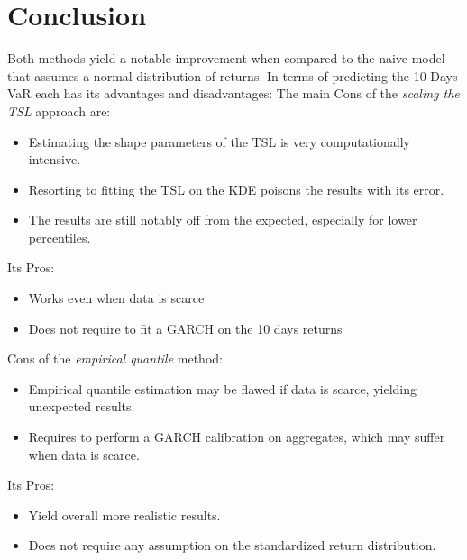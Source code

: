 \documentclass[11pt]{article}
\begin{document}
    \section{Conclusion}
    \label{sec:conclusion}
    Both methods yield a notable improvement when compared to the naive model that assumes a normal distribution of returns.
    In terms of predicting the 10 Days VaR each has its advantages and disadvantages:
    The main Cons of the \textit{scaling the TSL} approach are:
    \begin{itemize}
        \item Estimating the shape parameters of the TSL is very computationally intensive.
        \item Resorting to fitting the TSL on the KDE poisons the results with its error.
        \item The results are still notably off from the expected, especially for lower percentiles.
    \end{itemize}
    Its Pros:
    \begin{itemize}
        \item Works even when data is scarce
        \item Does not require to fit a GARCH on the 10 days returns
    \end{itemize}
    Cons of the \textit{empirical quantile} method:
    \begin{itemize}
        \item Empirical quantile estimation may be flawed if data is scarce, yielding unexpected results.
        \item Requires to perform a GARCH calibration on aggregates, which may suffer when data is scarce.
    \end{itemize}
    Its Pros:
    \begin{itemize}
        \item Yield overall more realistic results.
        \item Does not require any assumption on the standardized return distribution.
    \end{itemize}
    \printbibliography
\end{document}
